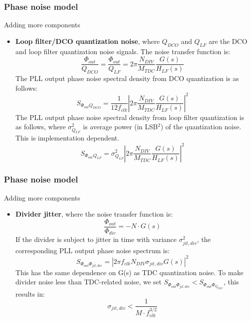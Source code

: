 \documentclass[t, screen, aspectratio=43]{beamer}
\begin{document}
\begin{frame}
	\frametitle{Phase noise model}
	\begin{block}{Adding more components}
		\begin{itemize}
			\scriptsize
			\item \textbf{Loop filter/DCO quantization noise}, where $Q_{DCO}$ and $Q_{LF}$ are the DCO and loop filter quantization noise signals. The noise transfer function is:
			\begin{equation}
				\frac{\Phi_{out}}{Q_{DCO}} = \frac{\Phi_{out}}{Q_{LF}} = 2\pi\frac{N_{DIV}}{M_{TDC}}\frac{G(s)}{H_{LF}(s)}
			\end{equation}
			The PLL output phase noise spectral density from DCO quantization is as follows:
			\begin{equation}
				S_{\Phi_{out} Q_{DCO}} = \frac{1}{12f_{clk}}\left|2\pi\frac{N_{DIV}}{M_{TDC}}\frac{G(s)}{H_{LF}(s)}\right|^2
			\end{equation}	
			The PLL output phase noise spectral density from loop filter quantization is as follows, where $\sigma_{Q_{LF}}^2$ is average power (in LSB$^2$) of the quantization noise. This is implementation dependent.
			\begin{equation}
				S_{\Phi_{out} Q_{LF}} = \sigma_{Q_{LF}}^2\left|2\pi\frac{N_{DIV}}{M_{TDC}}\frac{G(s)}{H_{LF}(s)}\right|^2
			\end{equation}			
		\end{itemize}    
	\end{block}
\end{frame}

\begin{frame}
	\frametitle{Phase noise model}
	\begin{block}{Adding more components}
		\begin{itemize}
			\scriptsize
			\item \textbf{Divider jitter}, where the noise transfer function is:
			\begin{equation}
				\frac{\Phi_{out}}{\Phi_{div}} = -N\cdot G(s)
			\end{equation}
			If the divider is subject to jitter in time with variance $\sigma_{jit,div}^2$, the corresponding PLL output phase noise spectrum is:
			\begin{equation}
				S_{\Phi_{out} \Phi_{jit,div}} = \left|2\pi f_{clk} N_{DIV} \sigma_{jit,div}G(s)\right|^2
			\end{equation}	
			This has the same dependence on G(s) as TDC quantization noise. To make divider noise less than TDC-related noise, we set $S_{\Phi_{out} \Phi_{jit,div}} < S_{\Phi_{out} \Phi_{Q_{TDC}}}$, this results in:
			\begin{equation}
				\sigma_{jit,div} < \frac{1}{M\cdot f_{clk}^{3/2}}
			\end{equation}
		\end{itemize}    
	\end{block}
\end{frame}
\end{document}
